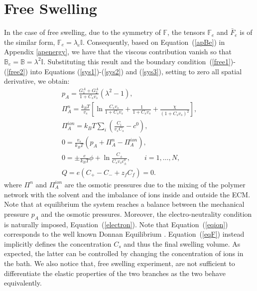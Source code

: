 \documentclass[runningheads]{llncs}
\newcommand{\F}{\ensuremath{\mathbb{F}}}
\newcommand{\B}{\ensuremath{\mathbb{B}}}
\begin{document}
\section{Free Swelling}
\label{apfree}
In the case of free swelling, due to the symmetry of $\F$, the tensors $\F_e$ and $\bar{F}_e$ is of the similar form, $\F_e=\lambda_e \mathbb{I}$. Consequently, based on Equation~(\ref{apBe}) in Appendix \ref{apenergy}, we have that the viscous contribution vanish so that $\B_e=\B= \lambda^2 \mathbb{I}$. Substituting this result and the boundary condition~(\ref{free1})-(\ref{free2}) into Equations (\ref{sys1})-(\ref{sys2}) and (\ref{sys3}), setting to zero all spatial derivative, we obtain:
\begin{gather}
p_A = \frac{G^A_1+G^A_2}{1+C_sv_s}(\lambda^2-1),\label{presA}\\
\Pi^{n}_A = \frac{k_BT}{v_s} \left[\ln \frac{C_s v_s}{1+C_s v_s} + \frac{1}{1+C_sv_s} +\frac{\chi}{(1+C_s v_s)^2}\right],\\
\Pi^{ion}_A = k_B T \sum_i \left(\frac{C_i}{v_sC_s}-c^0\right),\\
0 = \frac{v_s}{k_BT} (p_A+\Pi^{n}_A-\Pi^{ion}_A), \\[2mm]
0 = \pm\frac{e}{k_B T} \phi  + \ln \frac{C_\pm}{C_s v_s c_\pm^0},\qquad i=1,\ldots,N,\\[2.5mm]
Q = e\left(C_+-C_-+z_f C_{f}\right)=0.\label{electron}
\end{gather}
where $\Pi^{n}$ and $\Pi^{ion}_A$ are the osmotic pressures due to the mixing of the polymer network with the solvent and the imbalance of ions inside and outside the ECM. 
Note that at equilibrium the system reaches a balance between the mechanical pressure $p_A$ and the osmotic pressures. Moreover, the electro-neutrality condition is naturally imposed, Equation~(\ref{electron}). 
Note that Equation~(\ref{eqion}) corresponds to the well known Donnan Equilibrium \cite{DROZDOVph}. Equation~(\ref{eqF}) instead implicitly defines the concentration $C_s$ and thus the final swelling volume. As expected, the latter can be controlled by changing the concentration of ions in the bath. We also notice that, free swelling experiment, are not sufficient to differentiate the elastic properties of the two branches as the two behave equivalently.

%
\newpage


%
\end{document}
